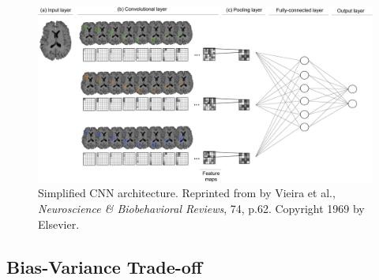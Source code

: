 \begin{figure}[H]
    \centering
        \includegraphics[scale=.9]{figures/DL.jpg}
        \caption[Simplified CNN architecture]{\footnotesize Simplified CNN architecture. Reprinted from  by Vieira et al., \textit{Neuroscience & Biobehavioral Reviews}, 74, p.62. Copyright 1969 by Elsevier. }
    \label{fig:cnn}
\end{figure}
\newpage
\subsection{Bias-Variance Trade-off} \label{bias-variance}

